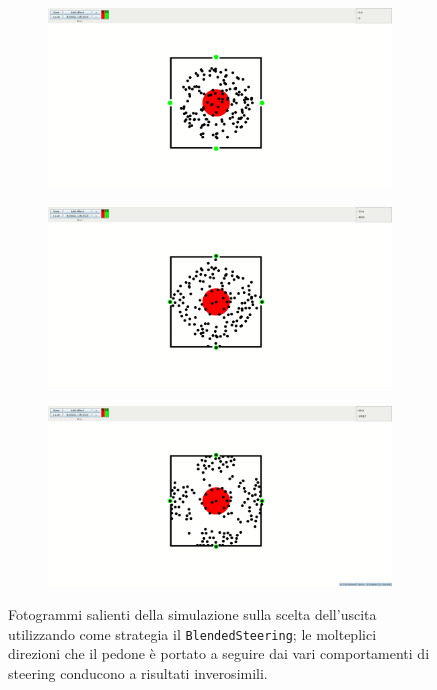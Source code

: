 \begin{figure}
    \centering
    \begin{subfigure}[b]{0.75\textwidth}
        \centering
        \includegraphics[width=\textwidth]{immagini/casi-studio/multiple-exits-blended-begin.png}
    \end{subfigure}
    \hfill
    \begin{subfigure}[b]{0.75\textwidth}
        \centering
        \includegraphics[width=\textwidth]{immagini/casi-studio/multiple-exits-blended-during.png}
    \end{subfigure}
    \hfill
    \begin{subfigure}[b]{0.75\textwidth}
        \centering
        \includegraphics[width=\textwidth]{immagini/casi-studio/multiple-exits-blended-end.png}
    \end{subfigure}
    \caption{Fotogrammi salienti della simulazione sulla scelta dell'uscita utilizzando come strategia il \texttt{BlendedSteering}; le molteplici direzioni che il pedone è portato a seguire dai vari comportamenti di steering conducono a risultati inverosimili.}
    \label{fig:multiple-exits-blended}
\end{figure}

